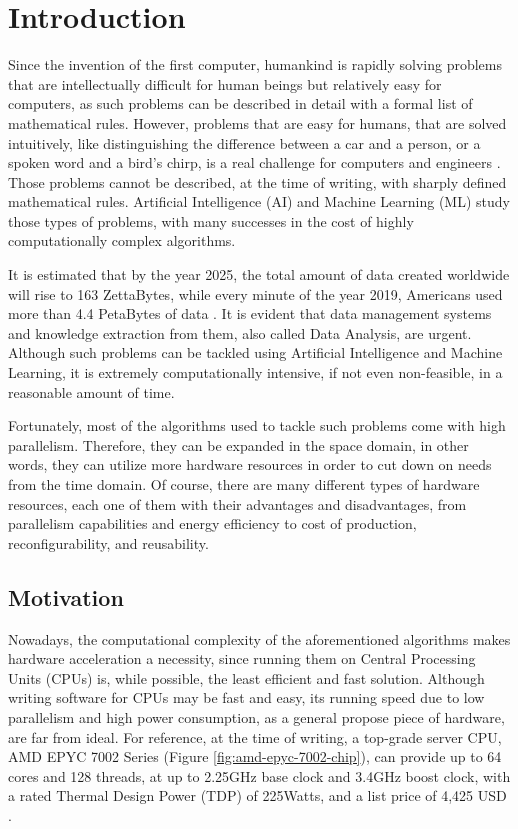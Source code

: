 \chapter{Introduction}

\label{Chapter-Introduction}

Since the invention of the first computer, humankind is rapidly solving problems that are intellectually difficult for human beings but relatively easy for computers, as such problems can be described in detail with a formal list of mathematical rules. However, problems that are easy for humans, that are solved intuitively, like distinguishing the difference between a car and a person, or a spoken word and a bird's chirp, is a real challenge for computers and engineers \cite{Goodfellow-et-al-2016}. Those problems cannot be described, at the time of writing, with sharply defined mathematical rules. Artificial Intelligence (AI) and Machine Learning (ML) study those types of problems, with many successes in the cost of highly computationally complex algorithms.

It is estimated that by the year 2025, the total amount of data created worldwide will rise to 163 ZettaBytes, while every minute of the year 2019, Americans used more than 4.4 PetaBytes of data \cite{Forbes-How-Much-Data-Is-Collected-Every-Minute-Of-The-Day}. It is evident that data management systems and knowledge extraction from them, also called Data Analysis, are urgent. Although such problems can be tackled using Artificial Intelligence and Machine Learning, it is extremely computationally intensive, if not even non-feasible, in a reasonable amount of time.

Fortunately, most of the algorithms used to tackle such problems come with high parallelism. Therefore, they can be expanded in the space domain, in other words, they can utilize more hardware resources in order to cut down on needs from the time domain. Of course, there are many different types of hardware resources, each one of them with their advantages and disadvantages, from parallelism capabilities and energy efficiency to cost of production, reconfigurability, and reusability.

\section{Motivation}
Nowadays, the computational complexity of the aforementioned algorithms makes hardware acceleration a necessity, since running them on Central Processing Units (CPUs) is, while possible, the least efficient and fast solution. Although writing software for CPUs may be fast and easy, its running speed due to low parallelism and high power consumption, as a general propose piece of hardware, are far from ideal. For reference, at the time of writing, a top-grade server CPU, AMD EPYC 7002 Series (Figure \ref{fig:amd-epyc-7002-chip}), can provide up to 64 cores and 128 threads, at up to 2.25GHz base clock and 3.4GHz boost clock, with a rated Thermal Design Power (TDP) of 225Watts, and a list price of 4,425 USD \cite{AMD-EPYC-7002-Series-Processors}.

